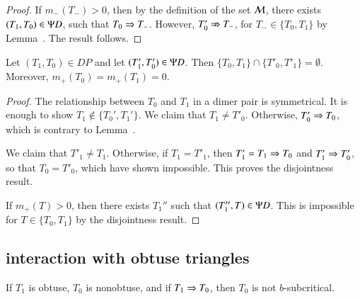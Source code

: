 \begin{proof}  
  If $m_-(T_-)>0$, then by the definition of the set $\mathcal M$, there
  exists $(T_1,T_0)\in \Psi D$, such that $T_0\Rightarrow T_-$.  However,
  $T'_0\nRightarrow T_-$, for $T_-\in\{T_0,T_1\}$ by
  Lemma~.  The result follows.
\end{proof}

\begin{lemma}  
  Let $(T_1,T_0)\in DP$ and let $(T'_1,T'_0)\in\Psi D$.  Then
  $\{T_0,T_1\}\cap \{T'_0,T'_1\} = \emptyset$.  Moreover,
  $m_+(T_0) = m_+(T_1)=0$.
\end{lemma}

\begin{proof}
  The relationship between $T_0$ and $T_1$ in a dimer pair is
  symmetrical.  It is enough to show $T_1\not\in\{T_0',T_1'\}$.  We
  claim that $T_1\ne T'_0$.  Otherwise, $T'_0\Rightarrow T_0$, which is
  contrary to Lemma~.

  We claim that $T'_1\ne T_1$.  Otherwise, if $T_1=T'_1$, then
  $T'_1=T_1\Rightarrow T_0$ and $T'_1\Rightarrow T'_0$, so that $T_0 = T'_0$, which
  have shown impossible.  This proves the disjointness result.


  If $m_+(T) >0$, then there exists $T_1''$ such that $(T_1'',T)\in
  \Psi D$.  This is impossible for $T\in\{T_0,T_1\}$ by the disjointness
  result.
\end{proof}


\subsection{interaction with obtuse triangles}

\begin{lemma}
  If $T_1$ is obtuse, $T_0$ is nonobtuse, and if $T_1 \Rightarrow T_0$, then
  $T_0$ is not $b$-subcritical.
\end{lemma}


